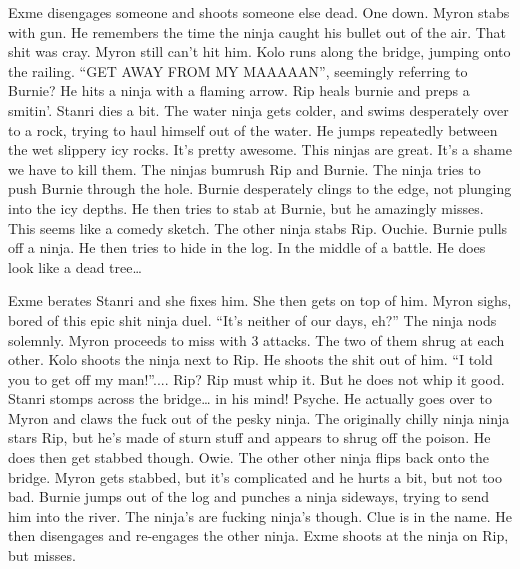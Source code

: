 \begin{multicols}{2}
Exme disengages someone and shoots someone else dead. One down. Myron stabs with gun. He remembers the time the ninja caught his bullet out of the air. That shit was cray. Myron still can’t hit him. Kolo runs along the bridge, jumping onto the railing. “GET AWAY FROM MY MAAAAAN”, seemingly referring to Burnie? He hits a ninja with a flaming arrow. Rip heals burnie and preps a smitin’. Stanri dies a bit. The water ninja gets colder, and swims desperately over to a rock, trying to haul himself out of the water. He jumps repeatedly between the wet slippery icy rocks. It’s pretty awesome. This ninjas are great. It’s a shame we have to kill them. The ninjas bumrush Rip and Burnie. The ninja tries to push Burnie through the hole. Burnie desperately clings to the edge, not plunging into the icy depths. He then tries to stab at Burnie, but he amazingly misses. This seems like a comedy sketch. The other ninja stabs Rip. Ouchie. Burnie pulls off a ninja. He then tries to hide in the log. In the middle of a battle. He does look like a dead tree…\medskip

Exme berates Stanri and she fixes him. She then gets on top of him. Myron sighs, bored of this epic shit ninja duel. “It’s neither of our days, eh?” The ninja nods solemnly. Myron proceeds to miss with 3 attacks. The two of them shrug at each other. Kolo shoots the ninja next to Rip. He shoots the shit out of him. “I told you to get off my man!”.... Rip? Rip must whip it. But he does not whip it good. Stanri stomps across the bridge… in his mind! Psyche. He actually goes over to Myron and claws the fuck out of the pesky ninja. The originally chilly ninja ninja stars Rip, but he’s made of sturn stuff and appears to shrug off the poison. He does then get stabbed though. Owie. The other other ninja flips back onto the bridge. Myron gets stabbed, but it’s complicated and he hurts a bit, but not too bad. Burnie jumps out of the log and punches a ninja sideways, trying to send him into the river. The ninja’s are fucking ninja’s though. Clue is in the name. He then disengages and re-engages the other ninja. Exme shoots at the ninja on Rip, but misses.\medskip


\end{multicols}
